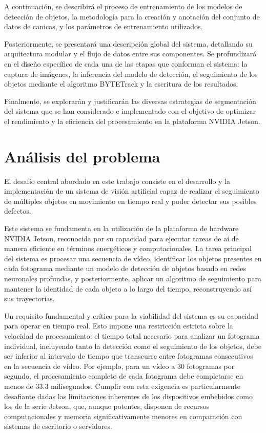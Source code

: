 \documentclass[11pt,spanish,listoffigures,listoftables]{tfgetsinf}
\begin{document}
A continuación, se describirá el proceso de entrenamiento de los modelos de detección de objetos, la metodología para la creación y anotación del conjunto de datos de canicas, y los parámetros de entrenamiento utilizados.

Posteriormente, se presentará una descripción global del sistema, detallando su arquitectura modular y el flujo de datos entre sus componentes. Se profundizará en el diseño específico de cada una de las etapas que conforman el sistema: la captura de imágenes, la inferencia del modelo de detección, el seguimiento de los objetos mediante el algoritmo BYTETrack y la escritura de los resultados.

Finalmente, se explorarán y justificarán las diversas estrategias de segmentación del sistema que se han considerado e implementado con el objetivo de optimizar el rendimiento y la eficiencia del procesamiento en la plataforma NVIDIA Jetson.



\section{Análisis del problema}\label{sec:analisis_problema}

El desafío central abordado en este trabajo consiste en el desarrollo y la implementación de un sistema de visión artificial capaz de realizar el seguimiento de múltiples objetos en movimiento en tiempo real y poder detectar sus posibles defectos. 

Este sistema se fundamenta en la utilización de la plataforma de hardware NVIDIA Jetson, reconocida por su capacidad para ejecutar tareas de \gls{ai} de manera eficiente en términos energéticos y computacionales. La tarea principal del sistema es procesar una secuencia de vídeo, identificar los objetos presentes en cada fotograma mediante un modelo de detección de objetos basado en redes neuronales profundas, y posteriormente, aplicar un algoritmo de seguimiento para mantener la identidad de cada objeto a lo largo del tiempo, reconstruyendo así sus trayectorias.

Un requisito fundamental y crítico para la viabilidad del sistema es su capacidad para operar en tiempo real. Esto impone una restricción estricta sobre la velocidad de procesamiento: el tiempo total necesario para analizar un fotograma individual, incluyendo tanto la detección como el seguimiento de los objetos, debe ser inferior al intervalo de tiempo que transcurre entre fotogramas consecutivos en la secuencia de vídeo. Por ejemplo, para un vídeo a 30 fotogramas por segundo, el procesamiento completo de cada fotograma debe completarse en menos de 33.3 milisegundos. Cumplir con esta exigencia es particularmente desafiante dadas las limitaciones inherentes de los dispositivos embebidos como los de la serie Jetson, que, aunque potentes, disponen de recursos computacionales y memoria significativamente menores en comparación con sistemas de escritorio o servidores.
\end{document}
